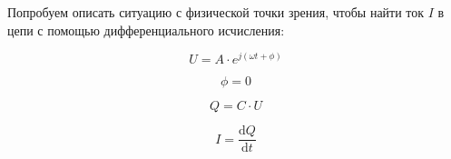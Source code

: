 \documentclass[a4paper, 10pt, final]{article} %
\begin{document}
    \noindent Попробуем описать ситуацию с физической точки зрения, чтобы найти ток $I$ в цепи с помощью дифференциального исчисления:
    \begin{figure}[H]
        \centering
        \begin{minipage}[b]{.21\linewidth}
            \centering
            \begin{equation} \label{eqn:CapTrasferFunctionExample1}
                U = A \cdot e^{j \left( \omega t + \phi \right)}
            \end{equation}
        \end{minipage}
        \hspace{0.04\linewidth}
        \begin{minipage}[b]{.21\linewidth}
            \centering
            \begin{equation} \label{eqn:CapTrasferFunctionExample2}
                \phi = 0
            \end{equation}
        \end{minipage}
        \hspace{0.04\linewidth}
        \begin{minipage}[b]{.21\linewidth}
            \centering
            \begin{equation} \label{eqn:CapTrasferFunctionExample3}
                Q = C \cdot U
            \end{equation}
        \end{minipage}
        \hspace{0.04\linewidth}
        \begin{minipage}[b]{.21\linewidth}
            \centering
            \begin{equation} \label{eqn:CapTrasferFunctionExample4}
                I = \frac{\textrm{d}Q}{\textrm{d}t}
            \end{equation}
        \end{minipage}
    \end{figure}
\end{document}

